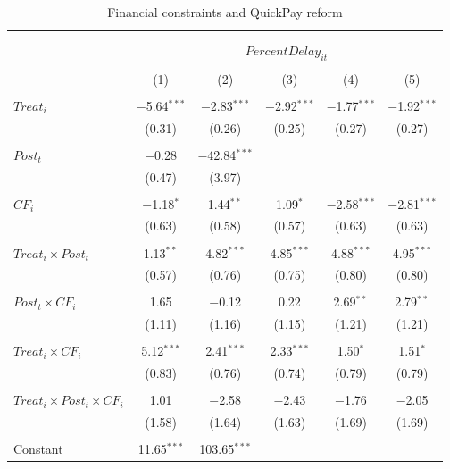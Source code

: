 \documentclass[
]{article}
\begin{document}
\begin{table}[H] \centering 
  \caption{Financial constraints and QuickPay reform} 
  \label{} 
\small 
\begin{tabular}{@{\extracolsep{-2pt}}lccccc} 
\\[-1.8ex]\hline 
\hline \\[-1.8ex] 
\\[-1.8ex] & \multicolumn{5}{c}{$PercentDelay_{it}$  } \\ 
\\[-1.8ex] & (1) & (2) & (3) & (4) & (5)\\ 
\hline \\[-1.8ex] 
 $Treat_i$ & $-$5.64$^{***}$ & $-$2.83$^{***}$ & $-$2.92$^{***}$ & $-$1.77$^{***}$ & $-$1.92$^{***}$ \\ 
  & (0.31) & (0.26) & (0.25) & (0.27) & (0.27) \\ 
  & & & & & \\ 
 $Post_t$ & $-$0.28 & $-$42.84$^{***}$ &  &  &  \\ 
  & (0.47) & (3.97) &  &  &  \\ 
  & & & & & \\ 
 $CF_i$ & $-$1.18$^{*}$ & 1.44$^{**}$ & 1.09$^{*}$ & $-$2.58$^{***}$ & $-$2.81$^{***}$ \\ 
  & (0.63) & (0.58) & (0.57) & (0.63) & (0.63) \\ 
  & & & & & \\ 
 $Treat_i \times Post_t$ & 1.13$^{**}$ & 4.82$^{***}$ & 4.85$^{***}$ & 4.88$^{***}$ & 4.95$^{***}$ \\ 
  & (0.57) & (0.76) & (0.75) & (0.80) & (0.80) \\ 
  & & & & & \\ 
 $Post_t \times CF_i$ & 1.65 & $-$0.12 & 0.22 & 2.69$^{**}$ & 2.79$^{**}$ \\ 
  & (1.11) & (1.16) & (1.15) & (1.21) & (1.21) \\ 
  & & & & & \\ 
 $Treat_i \times CF_i$ & 5.12$^{***}$ & 2.41$^{***}$ & 2.33$^{***}$ & 1.50$^{*}$ & 1.51$^{*}$ \\ 
  & (0.83) & (0.76) & (0.74) & (0.79) & (0.79) \\ 
  & & & & & \\ 
 $Treat_i \times Post_t \times CF_i$ & 1.01 & $-$2.58 & $-$2.43 & $-$1.76 & $-$2.05 \\ 
  & (1.58) & (1.64) & (1.63) & (1.69) & (1.69) \\ 
  & & & & & \\ 
 Constant & 11.65$^{***}$ & 103.65$^{***}$ &  &  &  \\ 

\end{tabular}
\end{table}
\end{document}
